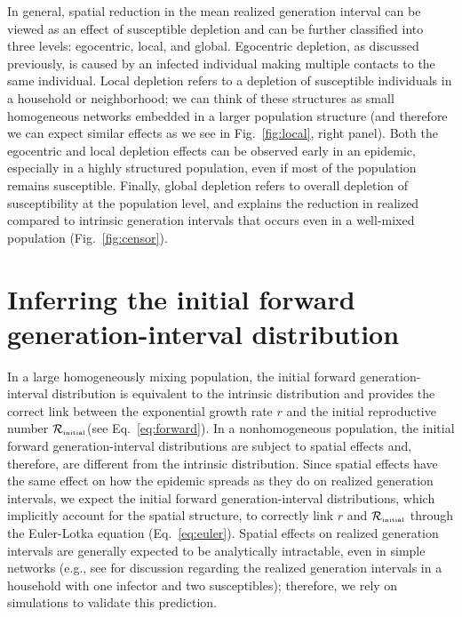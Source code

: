 \documentclass[12pt]{article}
\newcommand{\eref}[1]{Eq.~\ref{eq:#1}}
\newcommand{\fref}[1]{Fig.~\ref{fig:#1}}
\newcommand{\Rx}[1]{\ensuremath{{\mathcal R}_{#1}}\xspace}
\newcommand{\Rini}{\Rx{\textrm{\tiny initial}}}
\begin{document}
In general, spatial reduction in the mean realized generation interval can be viewed as an effect of susceptible depletion and can be further classified into three levels: egocentric, local, and global.
Egocentric depletion, as discussed previously, is caused by an infected individual making multiple contacts to the same individual.
Local depletion refers to a depletion of susceptible individuals in a household or neighborhood;
we can think of these structures as small homogeneous networks embedded in a larger population structure (and therefore we can expect similar effects as we see in \fref{local}, right panel).
Both the egocentric and local depletion effects can be observed early in an epidemic, especially in a highly structured population, even if most of the population remains susceptible.
Finally, global depletion refers to overall depletion of susceptibility at the population level, and explains the reduction in realized compared to intrinsic generation intervals that occurs even in a well-mixed population (\fref{censor}). 

\section{Inferring the initial forward generation-interval distribution}

In a large homogeneously mixing population, the initial forward generation-interval distribution is equivalent to the intrinsic distribution and provides the correct link between the exponential growth rate $r$ and the initial reproductive number \Rini (see \eref{forward}).
In a nonhomogeneous population, the initial forward generation-interval distributions are subject to spatial effects and, therefore, are different from the intrinsic distribution.
Since spatial effects have the same effect on how the epidemic spreads as they do on realized generation intervals, we expect the initial forward generation-interval distributions, which implicitly account for the spatial structure, to correctly link $r$ and $\Rini$ through the Euler-Lotka equation (\eref{euler}).
Spatial effects on realized generation intervals are generally expected to be analytically intractable, even in simple networks (e.g., see \cite{tomba2010some} for discussion regarding the realized generation intervals in a household with one infector and two susceptibles); therefore, we rely on simulations to validate this prediction.
\end{document}

